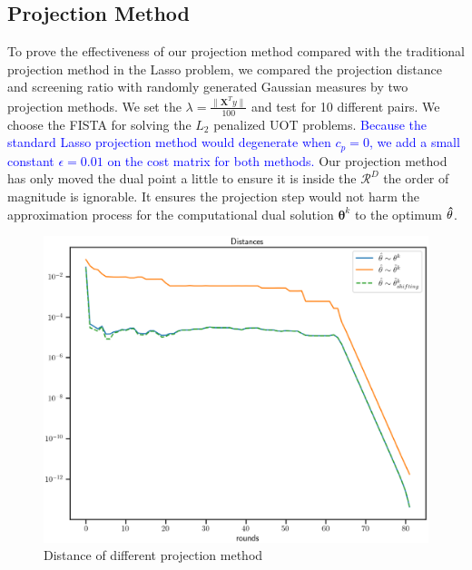 \documentclass[twoside]{article}
\theoremstyle{plain}
\renewcommand{\vec}[1]{\bm{#1}}
\newcommand{\changeXS}[1]{\textcolor{blue}{#1}}
\begin{document}
\subsection{Projection Method}
To prove the effectiveness of our projection method compared with the traditional projection method in the Lasso problem, we compared the projection distance and screening ratio with randomly generated Gaussian measures by two projection methods. We set the $\lambda = \frac{\|\mathbf{X}^Ty\|}{100}$ and test for 10 different pairs. We choose the FISTA for solving the $L_2$ penalized UOT problems. \changeXS{Because the standard Lasso projection method would degenerate when $c_p=0$, we add a small constant $\epsilon=0.01$ on the cost matrix for both methods.} Our projection method has only moved the dual point a little to ensure it is inside the $\mathcal{R}^{D}$ the order of magnitude is ignorable. It ensures the projection step would not harm the approximation process for the computational dual solution $\vec\theta^{k}$ to the optimum $\vec \hat {\theta}$.
\begin{figure}[h]
\begin{center}
\includegraphics[width = \linewidth]{pic/projdis}
\caption{Distance of different projection method}
\end{center}
\end{figure}
\end{document}
